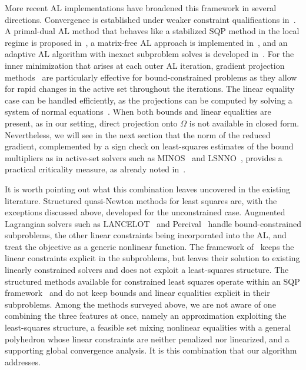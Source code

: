 \documentclass{article}
\numberwithin{equation}{section}
\theoremstyle{plain}
\begin{document}
More recent AL implementations have broadened this framework in several directions. Convergence is established under weaker constraint qualifications in~\cite{andreani-etal:2008}. A primal-dual AL method that behaves like a stabilized SQP method in the local regime is proposed in~\cite{gillrobinson:2012}, a matrix-free AL approach is implemented in~\cite{arreckx-etal:2016}, and an adaptive AL algorithm with inexact subproblem solves is developed in~\cite{curtis-etal:2015}.
For the inner minimization that arises at each outer AL iteration, gradient projection methods~\cite{moretoraldo:1991, linmore:1999a} are particularly effective for bound-constrained problems as they allow for rapid changes in the active set throughout the iterations. The linear equality case can be handled efficiently, as the projections can be computed by solving a system of normal equations~\cite{gould-etal:2001}.
When both bounds and linear equalities are present, as in our setting, direct projection onto $\Omega$ is not available in closed form. Nevertheless, we will see in the next section that the norm of the reduced gradient, complemented by a sign check on least-squares estimates of the bound multipliers as in active-set solvers such as MINOS~\cite{murtaghsaunders:1978} and LSNNO~\cite{tointtuyttens:1992}, provides a practical criticality measure, as already noted in~\cite[Section~7.2]{conn-etal:1996b}.

It is worth pointing out what this combination leaves uncovered in the existing literature. Structured quasi-Newton methods for least squares are, with the exceptions discussed above, developed for the unconstrained case. Augmented Lagrangian solvers such as LANCELOT~\cite{conn-etal:1992} and Percival~\cite{arreckx-etal:2016} handle bound-constrained subproblems, the other linear constraints being incorporated into the AL, and treat the objective as a generic nonlinear function. The framework of~\cite{conn-etal:1996b} keeps the linear constraints explicit in the subproblems, but leaves their solution to existing linearly constrained solvers and does not exploit a least-squares structure. The structured methods available for constrained least squares operate within an SQP framework~\cite{amiribartels:1989, tjoabiegler:1991, li-etal:2002} and do not keep bounds and linear equalities explicit in their subproblems. Among the methods surveyed above, we are not aware of one combining the three features at once, namely an approximation exploiting the least-squares structure, a feasible set mixing nonlinear equalities with a general polyhedron whose linear constraints are neither penalized nor linearized, and a supporting global convergence analysis. It is this combination that our algorithm addresses.
\end{document}
